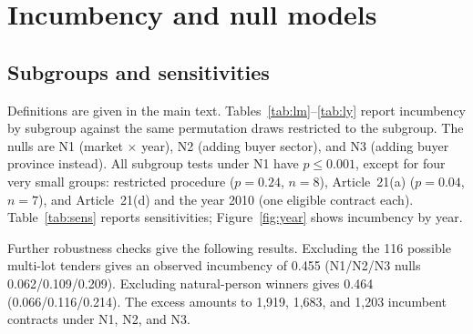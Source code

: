 \documentclass[11pt,a4paper]{article}
\begin{document}
\section{Incumbency and null models}

\subsection{Subgroups and sensitivities}
Definitions are given in the main text. Tables~\ref{tab:lm}--\ref{tab:ly} report incumbency by subgroup against the same permutation draws restricted to the subgroup. The nulls are N1 (market $\times$ year), N2 (adding buyer sector), and N3 (adding buyer province instead). All subgroup tests under N1 have $p\leq0.001$, except for four very small groups: restricted procedure ($p=0.24$, $n=8$), Article~21(a) ($p=0.04$, $n=7$), and Article~21(d) and the year 2010 (one eligible contract each). Table~\ref{tab:sens} reports sensitivities; Figure~\ref{fig:year} shows incumbency by year.

\begin{table}[h]\centering\small\caption{Incumbency by product category.}\label{tab:lm}\end{table}
\begin{table}[h]\centering\small\caption{Incumbency by buyer sector.}\label{tab:ls}\end{table}
\begin{table}[h]\centering\small\caption{Incumbency by buyer type (keyword classes of buyer names).}\label{tab:lb}\resizebox{\textwidth}{!}{}\end{table}
\begin{table}[h]\centering\small\caption{Incumbency by procedure.}\label{tab:lp}\end{table}
\begin{table}[h]\centering\small\caption{Incumbency by year.}\label{tab:ly}\end{table}
\begin{table}[h]\centering\small\caption{Sensitivity of the incumbency result (1,000 permutations each; all $p\leq0.001$).}\label{tab:sens}\resizebox{\textwidth}{!}{}\end{table}

Further robustness checks give the following results. Excluding the 116 possible multi-lot tenders gives an observed incumbency of 0.455 (N1/N2/N3 nulls 0.062/0.109/0.209). Excluding natural-person winners gives 0.464 (0.066/0.116/0.214). The excess amounts to 1,919, 1,683, and 1,203 incumbent contracts under N1, N2, and N3.
\end{document}
